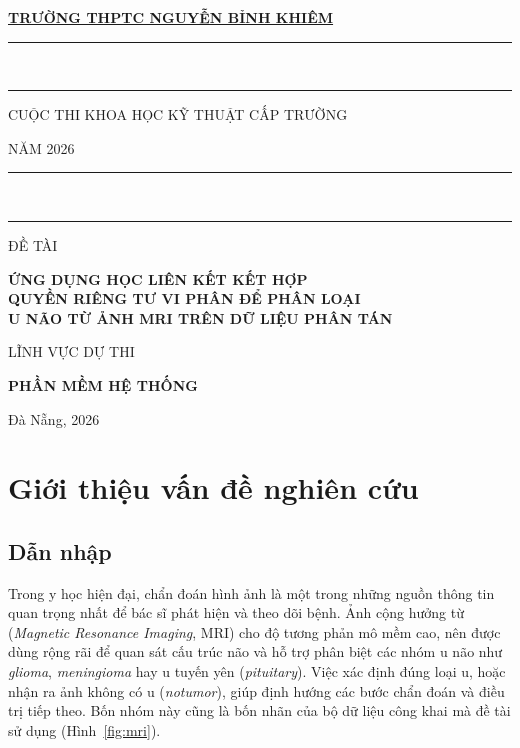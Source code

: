 \documentclass[12pt,a4paper]{report}
\begin{document}
\begin{titlepage}\singlespacing\centering
{\large\bfseries\underline{TRƯỜNG THPTC NGUYỄN BỈNH KHIÊM}\par}
\vspace{1.4cm}
\rule{\textwidth}{1.8pt}\\[-0.5pt]\rule{\textwidth}{0.5pt}\par
\vspace{0.9cm}
{\large CUỘC THI KHOA HỌC KỸ THUẬT CẤP TRƯỜNG\par}\vspace{0.5cm}
{\large NĂM 2026\par}
\vspace{0.7cm}
\rule{0.92\textwidth}{1.8pt}\\[-0.5pt]\rule{0.92\textwidth}{0.5pt}\par
\vspace{2.6cm}
{\large ĐỀ TÀI\par}\vspace{0.7cm}
{\Large\bfseries ỨNG DỤNG HỌC LIÊN KẾT KẾT HỢP\\[4pt] QUYỀN RIÊNG TƯ VI PHÂN ĐỂ PHÂN LOẠI\\[4pt] U NÃO TỪ ẢNH MRI TRÊN DỮ LIỆU PHÂN TÁN\par}
\vspace{3.6cm}
{\large LĨNH VỰC DỰ THI\par}\vspace{0.2cm}
{\large\bfseries PHẦN MỀM HỆ THỐNG\par}
\vfill
{\large Đà Nẵng, 2026\par}
\end{titlepage}

\tableofcontents
\clearpage

\chapter{Giới thiệu vấn đề nghiên cứu}
\section{Dẫn nhập}
Trong y học hiện đại, chẩn đoán hình ảnh là một trong những nguồn thông tin quan trọng nhất để bác sĩ phát hiện và theo dõi bệnh. Ảnh cộng hưởng từ (\textit{Magnetic Resonance Imaging}, MRI) cho độ tương phản mô mềm cao, nên được dùng rộng rãi để quan sát cấu trúc não và hỗ trợ phân biệt các nhóm u não như \textit{glioma}, \textit{meningioma} hay u tuyến yên (\textit{pituitary}). Việc xác định đúng loại u, hoặc nhận ra ảnh không có u (\textit{notumor}), giúp định hướng các bước chẩn đoán và điều trị tiếp theo. Bốn nhóm này cũng là bốn nhãn của bộ dữ liệu công khai mà đề tài sử dụng \citep{dataset} (Hình~\ref{fig:mri}).
\end{document}
